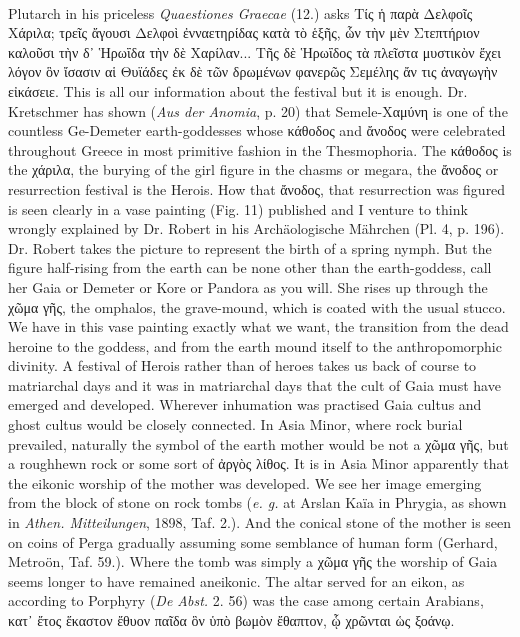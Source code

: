 \documentclass[a4paper, 11pt, oneside, polutonikogreek, english]{article}
\begin{document}
\paragraph{}
Plutarch in his priceless \emph{Quaestiones Graecae} (12.) asks Τίς ἡ παρὰ Δελφοῖς Χάριλα; τρεῖς ἄγουσι Δελφοὶ ἐνναετηρίδας κατὰ τὸ ἑξῆς, ὧν τὴν μὲν Στεπτήριον καλοῦσι τὴν δ᾽ Ἡρωΐδα τὴν δὲ Χαρίλαν... Τῆς δὲ Ἡρωΐδος τὰ πλεῖστα μυστικὸν ἔχει λόγον ὃν ἴσασιν αἱ Θυϊάδες ἐκ δὲ τῶν δρωμένων φανερῶς Σεμέλης ἄν τις ἀναγωγὴν εἰκάσειε. This is all our information about the festival but it is enough. Dr. Kretschmer has shown (\emph{Aus der Anomia}, p. 20) that Semele-Χαμύνη is one of the countless Ge-Demeter earth-goddesses whose κάθοδος and ἄνοδος were celebrated throughout Greece in most primitive fashion in the Thesmophoria. The κάθοδος is the χάριλα, the burying of the girl figure in the chasms or megara, the ἄνοδος or resurrection festival is the Herois. How that ἄνοδος, that resurrection was figured is seen clearly in a vase painting (Fig. 11) published and I venture to think wrongly explained by Dr. Robert in his Archäologische Mährchen (Pl. 4, p. 196). Dr. Robert takes the picture to represent the birth of a spring nymph. But the figure half-rising from the earth can be none other than the earth-goddess, call her Gaia or Demeter or Kore or Pandora as you will. She rises up through the χῶμα γῆς, the omphalos, the grave-mound, which is coated with the usual stucco. We have in this vase painting exactly what we want, the transition from the dead heroine to the goddess, and from the earth mound itself to the anthropomorphic divinity. A festival of Herois rather than of heroes takes us back of course to matriarchal days and it was in matriarchal days that the cult of Gaia must have emerged and developed. Wherever inhumation was practised Gaia cultus and ghost cultus would be closely connected. In Asia Minor, where rock burial prevailed, naturally the symbol of the earth mother would be not a χῶμα γῆς, but a roughhewn rock or some sort of ἀργὸς λίθος. It is in Asia Minor apparently that the eikonic worship of the mother was developed. We see her image emerging from the block of stone on rock tombs (\emph{e. g.} at Arslan Kaïa in Phrygia, as shown in \emph{Athen. Mitteilungen}, 1898, Taf. 2.). And the conical stone of the mother is seen on coins of Perga gradually assuming some semblance of human form (Gerhard, Metroön, Taf. 59.). Where the tomb was simply a χῶμα γῆς the worship of Gaia seems longer to have remained aneikonic. The altar served for an eikon, as according to Porphyry (\emph{De Abst.} 2. 56) was the case among certain Arabians, κατ᾿ ἔτος ἕκαστον ἔθυον παῖδα ὃν ὑπὸ βωμὸν ἔθαπτον, ᾧ χρῶνται ὡς ξοάνῳ.
\end{document}
